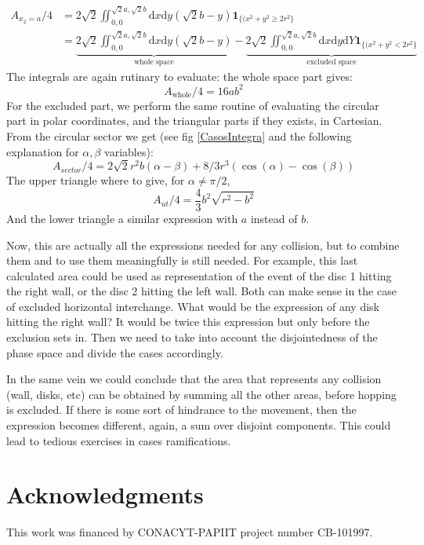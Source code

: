 \documentclass[letterpaper,10pt, jcp, aps]{revtex4-1}
\newcommand{\rd}{\!\mathrm{d}}
\newcommand{\indicator}[1]{\mathbf{1}_{ \{   #1 \} } }
\begin{document}
    \begin{align}
      A_{x_2=a}/4 & =2\sqrt{2}\iint_{0,0}^{\sqrt{2}a,\sqrt{2}b}
        \rd x \rd y (\sqrt{2} b - y)
        \indicator{(x^2+y^2 \geq 2 r^2}\\
     &=\underbrace{2\sqrt{2}\iint_{0,0}^{\sqrt{2}a,\sqrt{2}b}
        \rd x \rd y (\sqrt{2} b - y)}_{\text{whole space}}
      -\underbrace{2\sqrt{2}\iint_{0,0}^{\sqrt{2}a,\sqrt{2}b}
        \rd x \rd y \rd Y 
        \indicator{(x^2+y^2 < 2 r^2}}_{\text{excluded space}}
       \end{align}
    The integrals are again rutinary to evaluate: the whole space part
    gives:
    \begin{equation}
      A_{\text{whole}}/4=16ab^2
    \end{equation}
    For the excluded part, we perform the same routine of evaluating the circular part
    in polar coordinates, and the triangular parts if they exists, in Cartesian.
    From the circular sector we get (see fig \ref{CasosIntegra} and the following explanation
    for $\alpha, \beta$ variables):
    \begin{equation}
      A_{sector}/4=2\sqrt{2} r^2 b (\alpha - \beta)
      +8/3 r^3(\cos(\alpha)-\cos(\beta))
    \end{equation}
    The upper triangle where to give, for $\alpha \neq \pi/2$,
    \begin{equation}
    A_{ut}/4=\frac{4}{3}b^2\sqrt{r^2-b^2}
    \end{equation}
    And the lower triangle a similar expression with $a$ instead of $b$.

    Now, this are actually all the expressions needed for any collision, but
    to combine them and to use them meaningfully is still needed. For example,
    this last calculated area could be used as representation of the event of
    the disc 1 hitting the right wall, or the disc 2 hitting the left wall. Both
    can make sense in the case of excluded horizontal interchange. What would be
    the expression of any disk hitting the right wall? It would be twice this expression
    but only before the exclusion sets in. Then we need to take into account
    the disjointedness of the phase space and divide the cases accordingly.

    In the same vein we could conclude that the area that represents
    any collision (wall, disks, etc) can be obtained by summing all the other
    areas, before hopping is excluded. If there is some sort of hindrance to
    the movement, then the expression becomes different, again, a sum over
    disjoint components. This could lead to tedious exercises in cases ramifications.

    
    
    

    

    
\section{Acknowledgments}


This work was financed by CONACYT-PAPIIT project number CB-101997.






\end{document}
